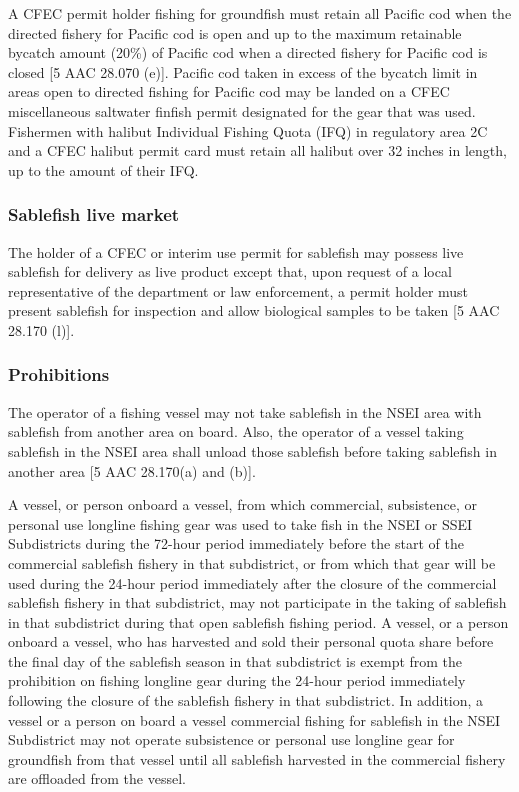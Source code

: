 \documentclass[
]{article}
\begin{document}
A CFEC permit holder fishing for groundfish must retain all Pacific cod
when the directed fishery for Pacific cod is open and up to the maximum
retainable bycatch amount (20\%) of Pacific cod when a directed fishery
for Pacific cod is closed {[}5 AAC 28.070 (e){]}. Pacific cod taken in
excess of the bycatch limit in areas open to directed fishing for
Pacific cod may be landed on a CFEC miscellaneous saltwater finfish
permit designated for the gear that was used. Fishermen with halibut
Individual Fishing Quota (IFQ) in regulatory area 2C and a CFEC halibut
permit card must retain all halibut over 32 inches in length, up to the
amount of their IFQ.

\hypertarget{sablefish-live-market}{%
\subsubsection{Sablefish live market}\label{sablefish-live-market}}

The holder of a CFEC or interim use permit for sablefish may possess
live sablefish for delivery as live product except that, upon request of
a local representative of the department or law enforcement, a permit
holder must present sablefish for inspection and allow biological
samples to be taken {[}5 AAC 28.170 (l){]}.

\hypertarget{prohibitions}{%
\subsubsection{Prohibitions}\label{prohibitions}}

The operator of a fishing vessel may not take sablefish in the NSEI area
with sablefish from another area on board. Also, the operator of a
vessel taking sablefish in the NSEI area shall unload those sablefish
before taking sablefish in another area {[}5 AAC 28.170(a) and (b){]}.

A vessel, or person onboard a vessel, from which commercial,
subsistence, or personal use longline fishing gear was used to take fish
in the NSEI or SSEI Subdistricts during the 72-hour period immediately
before the start of the commercial sablefish fishery in that
subdistrict, or from which that gear will be used during the 24-hour
period immediately after the closure of the commercial sablefish fishery
in that subdistrict, may not participate in the taking of sablefish in
that subdistrict during that open sablefish fishing period. A vessel, or
a person onboard a vessel, who has harvested and sold their personal
quota share before the final day of the sablefish season in that
subdistrict is exempt from the prohibition on fishing longline gear
during the 24-hour period immediately following the closure of the
sablefish fishery in that subdistrict. In addition, a vessel or a person
on board a vessel commercial fishing for sablefish in the NSEI
Subdistrict may not operate subsistence or personal use longline gear
for groundfish from that vessel until all sablefish harvested in the
commercial fishery are offloaded from the vessel.
\end{document}
